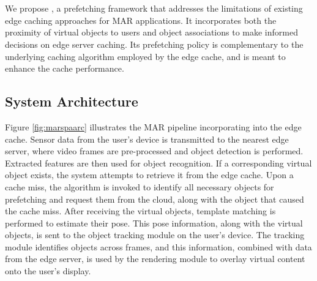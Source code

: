 \section{\spaarc}
\label{sec:spaar}
We propose \spaarc, a prefetching framework that addresses the limitations of existing edge caching approaches for MAR applications. It incorporates both the proximity of virtual objects to users and object associations to make informed decisions on edge server caching. Its prefetching policy is complementary to the underlying caching algorithm employed by the edge cache, and is meant to enhance the cache performance.

    \subsection{System Architecture}
        Figure \ref{fig:marspaarc} illustrates the MAR pipeline incorporating \spaarc{} into the edge cache.  Sensor data from the user's device is transmitted to the nearest edge server, where video frames are pre-processed and object detection is performed.  Extracted features are then used for object recognition. If a corresponding virtual object exists, the system attempts to retrieve it from the edge cache.  Upon a cache miss, the \spaarc{} algorithm is invoked to identify all necessary objects for prefetching and request them from the cloud, along with the object that caused the cache miss. After receiving the virtual objects, template matching is performed to estimate their pose. This pose information, along with the virtual objects, is sent to the object tracking module on the user's device.  The tracking module identifies objects across frames, and this information, combined with data from the edge server, is used by the rendering module to overlay virtual content onto the user's display.
        

